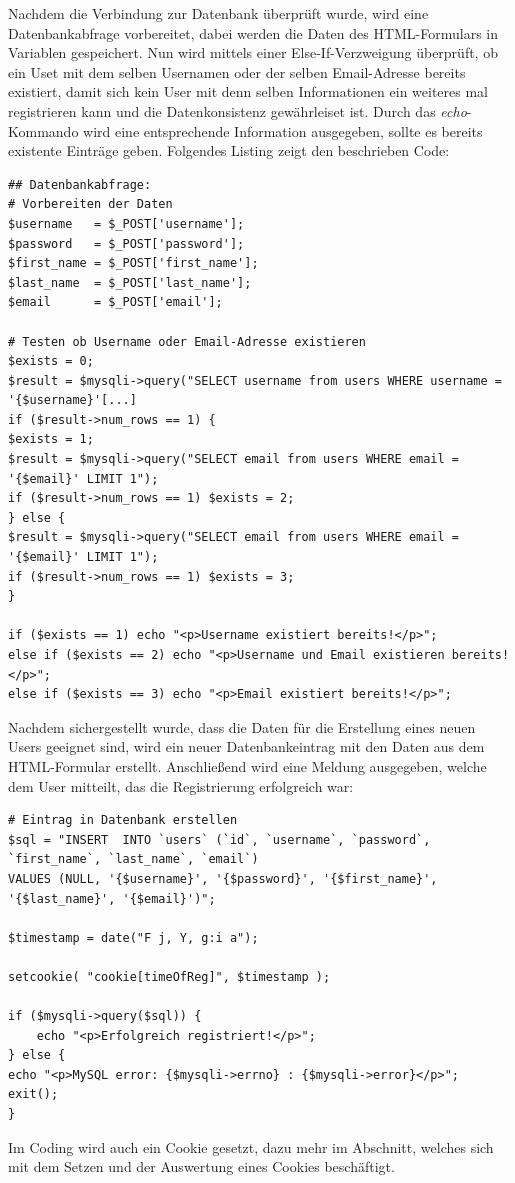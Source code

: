 \documentclass{article}
\begin{document}
	Nachdem die Verbindung zur Datenbank \"uberpr\"uft wurde, wird eine Datenbankabfrage vorbereitet, dabei werden die Daten des HTML-Formulars in Variablen gespeichert. Nun wird mittels einer Else-If-Verzweigung \"uberpr\"uft, ob ein Uset mit dem selben Usernamen oder der selben Email-Adresse bereits existiert, damit sich kein User mit denn selben Informationen ein weiteres mal registrieren kann und die Datenkonsistenz gew\"ahrleiset ist. Durch das \textit{echo}-Kommando wird eine entsprechende Information ausgegeben, sollte es bereits existente Eintr\"age geben. Folgendes Listing zeigt den beschrieben Code:
	\newline
	
	\begin{lstlisting}
## Datenbankabfrage:
# Vorbereiten der Daten
$username   = $_POST['username'];
$password   = $_POST['password'];
$first_name = $_POST['first_name'];
$last_name  = $_POST['last_name'];
$email      = $_POST['email'];
	
# Testen ob Username oder Email-Adresse existieren
$exists = 0;
$result = $mysqli->query("SELECT username from users WHERE username = '{$username}'[...]
if ($result->num_rows == 1) {
$exists = 1;
$result = $mysqli->query("SELECT email from users WHERE email = '{$email}' LIMIT 1");
if ($result->num_rows == 1) $exists = 2;    
} else {
$result = $mysqli->query("SELECT email from users WHERE email = '{$email}' LIMIT 1");
if ($result->num_rows == 1) $exists = 3;
}

if ($exists == 1) echo "<p>Username existiert bereits!</p>";
else if ($exists == 2) echo "<p>Username und Email existieren bereits!</p>";
else if ($exists == 3) echo "<p>Email existiert bereits!</p>";
\end{lstlisting}

Nachdem sichergestellt wurde, dass die Daten f\"ur die Erstellung eines neuen Users geeignet sind, wird ein neuer Datenbankeintrag mit den Daten aus dem HTML-Formular erstellt. Anschlie{\ss}end wird eine Meldung ausgegeben, welche dem User mitteilt, das die Registrierung erfolgreich war:
\begin{lstlisting}
# Eintrag in Datenbank erstellen
$sql = "INSERT  INTO `users` (`id`, `username`, `password`, `first_name`, `last_name`, `email`) 
VALUES (NULL, '{$username}', '{$password}', '{$first_name}', '{$last_name}', '{$email}')";

$timestamp = date("F j, Y, g:i a");

setcookie( "cookie[timeOfReg]", $timestamp );

if ($mysqli->query($sql)) {
	echo "<p>Erfolgreich registriert!</p>";
} else {
echo "<p>MySQL error: {$mysqli->errno} : {$mysqli->error}</p>";
exit();
}
\end{lstlisting}
Im Coding wird auch ein Cookie gesetzt, dazu mehr im Abschnitt, welches sich mit dem Setzen und der Auswertung eines Cookies besch\"aftigt.
	

	
\end{document}
